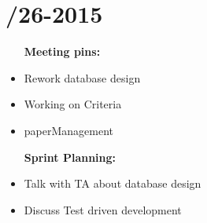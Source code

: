 \section{/26-2015} %
\attend{\at}{\nat}{\at}{\at}


\begin{itemize}
	\item [\textbf{Meeting pins:}]
	\item Rework database design
	\item Working on Criteria
	\item paperManagement
\end{itemize}

\begin{itemize}
	\item [\textbf{Sprint Planning:}]
	\item Talk with TA about database design
	\item Discuss Test driven development 
\end{itemize}

